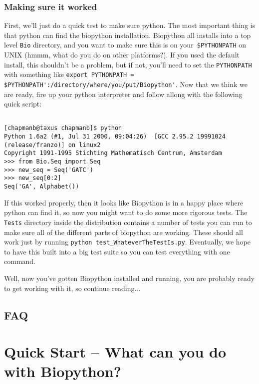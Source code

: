 \documentclass[dvips]{article}
\begin{document}
\subsubsection{Making sure it worked}

First, we'll just do a quick test to make sure python. The most important thing is that python can find the biopython installation. Biopython all installs into a top level \verb|Bio| directory, and you want to make sure this is on your\verb| $PYTHONPATH| on UNIX (hmmm, what do you do on other platforms?). If you used the default install, this shouldn't be a problem, but if not, you'll need to set the \verb|PYTHONPATH| with something like \verb|export PYTHONPATH = $PYTHONPATH':/directory/where/you/put/Biopython'|. Now that we think we are ready, fire up your python interpreter and follow allong with the following quick script:

\begin{verbatim}

[chapmanb@taxus chapmanb]$ python
Python 1.6a2 (#1, Jul 31 2000, 09:04:26)  [GCC 2.95.2 19991024 (release/franzo)] on linux2
Copyright 1991-1995 Stichting Mathematisch Centrum, Amsterdam
>>> from Bio.Seq import Seq
>>> new_seq = Seq('GATC') 
>>> new_seq[0:2]
Seq('GA', Alphabet())

\end{verbatim}

If this worked properly, then it looks like Biopython is in a happy place where python can find it, so now you might want to do some more rigorous tests. The \verb|Tests| directory inside the distribution contains a number of tests you can run to make sure all of the different parts of biopython are working. These should all work just by running \verb|python test_WhateverTheTestIs.py|. Eventually, we hope to have this built into a big test suite so you can test everything with one command. 


Well, now you've gotten Biopython installed and running, you are probably ready to get working with it, so continue reading...

\subsection{FAQ}



\section{Quick Start -- What can you do with Biopython?}
\end{document}

